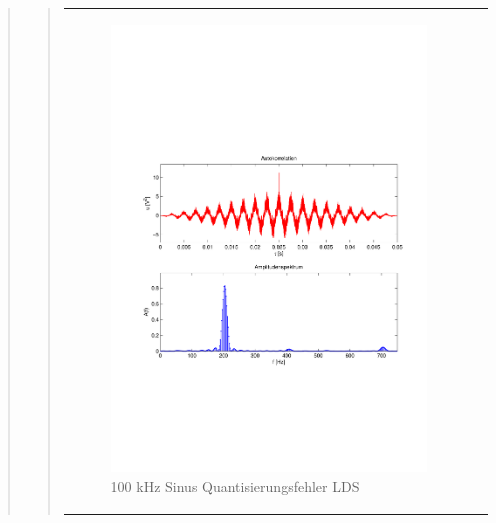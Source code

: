 \begin{quote}
\begin{quote}
\begin{center}
\begin{tabular}{ll}
                \begin{minipage}{0.6\textwidth}
                    \begin{figure}[H]
                        \includegraphics[scale=0.5, trim = 16mm 70mm 16mm 85mm, clip]
                                        {Bilder/100kHz_sin_LSD}
                        \caption{100 kHz Sinus Quantisierungsfehler LDS}
                        \label{fig:100kHz_sin_LDS}
                    \end{figure}
                \end{minipage}
            
            \end{tabular}
        \end{center}
            
        \vspace{2em}
    	
    	\end{quote}
    
\end{quote}


